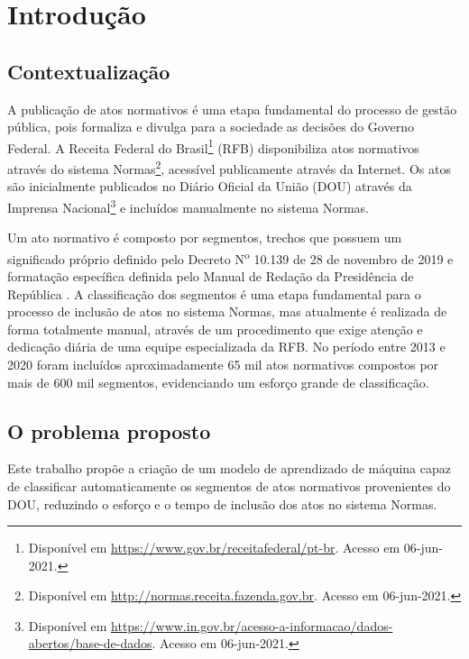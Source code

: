 \chapter{Introdução}

\section{Contextualização}

A publicação de atos normativos é uma etapa fundamental do processo de gestão pública, pois formaliza e divulga para a sociedade as decisões do Governo Federal. A Receita Federal do Brasil\footnote{Disponível em \url{https://www.gov.br/receitafederal/pt-br}. Acesso em 06-jun-2021.} (RFB) disponibiliza atos normativos através do sistema Normas\footnote{Disponível em \url{http://normas.receita.fazenda.gov.br}. Acesso em 06-jun-2021.}, acessível publicamente através da Internet. Os atos são inicialmente publicados no Diário Oficial da União (DOU) através da Imprensa Nacional\footnote{Disponível em \url{https://www.in.gov.br/acesso-a-informacao/dados-abertos/base-de-dados}. Acesso em 06-jun-2021.} e incluídos manualmente no sistema Normas.

Um ato normativo é composto por segmentos, trechos que possuem um significado próprio definido pelo Decreto N\textsuperscript{o} 10.139 de 28 de novembro de 2019 \cite{Decreto10139} e formatação específica definida pelo Manual de Redação da Presidência de República \cite{ManualRedacao2018}. A classificação dos segmentos é uma etapa fundamental para o processo de inclusão de atos no sistema Normas, mas atualmente é realizada de forma totalmente manual, através de um procedimento que exige atenção e dedicação diária de uma equipe especializada da RFB. No período entre 2013 e 2020 foram incluídos aproximadamente 65 mil atos normativos compostos por mais de 600 mil segmentos, evidenciando um esforço grande de classificação.

\section{O problema proposto}

Este trabalho propõe a criação de um modelo de aprendizado de máquina capaz de classificar automaticamente os segmentos de atos normativos provenientes do DOU, reduzindo o esforço e o tempo de inclusão dos atos no sistema Normas.     

